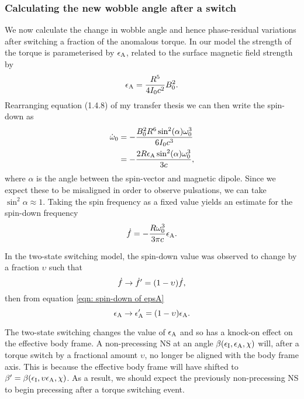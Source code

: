 \documentclass[../full_thesis/full_thesis.tex]{subfiles}
\begin{document}
\subsubsection{Calculating the new wobble angle after a switch}
We now calculate the change in wobble angle and hence phase-residual variations
after switching a fraction of the anomalous torque.
In our model the strength of the torque is parameterised
by $\epsilon_{\mathrm{A}}$, related to the surface magnetic field strength by 
\begin{align}
    \epsilon_{\mathrm{A}} = \frac{R^{5}}{4I_{0} c^{2}} B_{0}^{2}.
\end{align}
Rearranging equation (1.4.8) of my transfer thesis we can then write the 
spin-down as 
\begin{align}
    \dot{\omega}_{0} & = -\frac{B_{0}^{2}R^{6} \sin^{2}(\alpha) \omega_{0}^{3}}{6 I_{0} c^{3}} \\
    & = - \frac{2 R \epsilon_{\mathrm{A}} \sin^{2}(\alpha) \omega_{0}^{3}}{3 c},
\end{align}
where $\alpha$ is the angle between the spin-vector and magnetic dipole. Since
we expect these to be misaligned in order to observe pulsations, we can take
$\sin^{2}\alpha \approx 1$.
Taking the spin frequency as a fixed value yields an estimate for the
spin-down frequency
\begin{equation}
    \dot{f} = - \frac{R\omega_{0}^{3}}{3\pi c}\epsilon_{\mathrm{A}}.
    \label{eqn: spin-down of epsA}
\end{equation}

In the two-state switching model, the spin-down value was observed to change
by a fraction $\upsilon$ such that
\begin{equation}
    \dot{f} \rightarrow \dot{f}' = (1-\upsilon)\dot{f},
\end{equation}
then from equation \eqref{eqn: spin-down of epsA} 
\begin{equation}
    \epsilon_{\mathrm{A}} \rightarrow \epsilon_{\mathrm{A}}' = (1-\upsilon)\epsilon_{\mathrm{A}}.
\end{equation}

The two-state switching changes the value of $\epsilon_{\mathrm{A}}$ and so has a knock-on 
effect on the effective body frame. A non-precessing NS at an
angle $\beta(\epsilon_{\mathrm{I}}, \epsilon_{\mathrm{A}}, \chi)$ will, after a torque switch by a fractional
amount $\upsilon$, no longer be aligned with the body frame axis. This is 
because the effective body frame will have shifted to 
$\beta' = \beta(\epsilon_{\mathrm{I}}, \upsilon\epsilon_{\mathrm{A}}, \chi)$. As a result, we should expect the
previously non-precessing NS to begin precessing after a torque switching event. 
\end{document}
